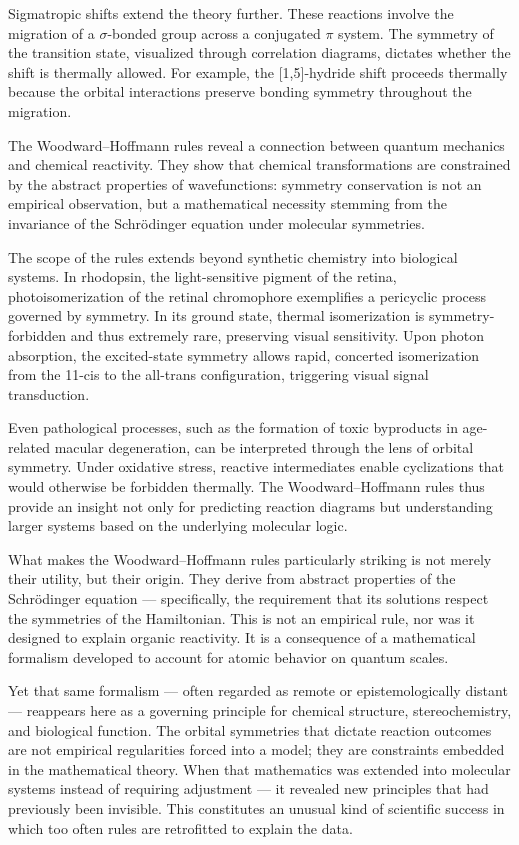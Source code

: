 Sigmatropic shifts extend the theory further. These reactions involve the migration of a $\sigma$-bonded group across a conjugated $\pi$ system. The symmetry of the transition state, visualized through correlation diagrams, dictates whether the shift is thermally allowed. For example, the [1,5]-hydride shift proceeds thermally because the orbital interactions preserve bonding symmetry throughout the migration.

The Woodward–Hoffmann rules reveal a connection between quantum mechanics and chemical reactivity. They show that chemical transformations are constrained by the abstract properties of wavefunctions: symmetry conservation is not an empirical observation, but a mathematical necessity stemming from the invariance of the Schrödinger equation under molecular symmetries.

The scope of the rules extends beyond synthetic chemistry into biological systems. In rhodopsin, the light-sensitive pigment of the retina, photoisomerization of the retinal chromophore exemplifies a pericyclic process governed by symmetry. In its ground state, thermal isomerization is symmetry-forbidden and thus extremely rare, preserving visual sensitivity. Upon photon absorption, the excited-state symmetry allows rapid, concerted isomerization from the 11-cis to the all-trans configuration, triggering visual signal transduction.

Even pathological processes, such as the formation of toxic byproducts in age-related macular degeneration, can be interpreted through the lens of orbital symmetry. Under oxidative stress, reactive intermediates enable cyclizations that would otherwise be forbidden thermally. The Woodward–Hoffmann rules thus provide an insight not only for predicting reaction diagrams but understanding larger systems based on the underlying molecular logic.
\newpage
\begin{commentary}
What makes the Woodward–Hoffmann rules particularly striking is not merely their utility, but their origin. They derive from abstract properties of the Schrödinger equation — specifically, the requirement that its solutions respect the symmetries of the Hamiltonian. This is not an empirical rule, nor was it designed to explain organic reactivity. It is a consequence of a mathematical formalism developed to account for atomic behavior on quantum scales.

Yet that same formalism — often regarded as remote or epistemologically distant — reappears here as a governing principle for chemical structure, stereochemistry, and biological function. The orbital symmetries that dictate reaction outcomes are not empirical regularities forced into a model; they are constraints embedded in the mathematical theory. When that mathematics was extended into molecular systems instead of requiring adjustment — it revealed new principles that had previously been invisible. This constitutes an unusual kind of scientific success in which too often rules are retrofitted to explain the data. 
\end{commentary}
